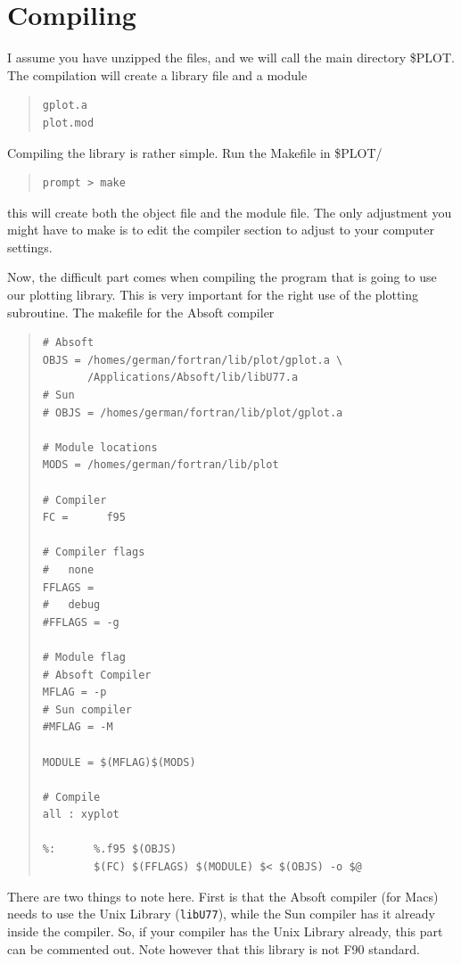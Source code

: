 \documentclass{article}
\begin{document}
\section{Compiling}
I assume you have unzipped the files, and we will call the main directory \$PLOT. The compilation will create a library file and a module
\begin{quote}
\begin{verbatim}
gplot.a
plot.mod
\end{verbatim}
\end{quote}

\noindent Compiling the library is rather simple. Run the Makefile in \$PLOT/
\begin{quote}
\begin{verbatim}
prompt > make
\end{verbatim}
\end{quote}
this will create both the object file and the module file. The only adjustment you might have to make is to edit the compiler section to adjust to your computer settings.

Now, the difficult part comes when compiling the program that is going to use our plotting library. This is very important for the right use of the plotting subroutine. The makefile for the Absoft compiler 
\begin{quote}
\begin{verbatim}
# Absoft
OBJS = /homes/german/fortran/lib/plot/gplot.a \
       /Applications/Absoft/lib/libU77.a 
# Sun 
# OBJS = /homes/german/fortran/lib/plot/gplot.a 

# Module locations
MODS = /homes/german/fortran/lib/plot

# Compiler
FC =      f95

# Compiler flags
#   none
FFLAGS = 
#   debug
#FFLAGS = -g 

# Module flag
# Absoft Compiler
MFLAG = -p
# Sun compiler
#MFLAG = -M

MODULE = $(MFLAG)$(MODS)

# Compile
all : xyplot 

%:      %.f95 $(OBJS)
        $(FC) $(FFLAGS) $(MODULE) $< $(OBJS) -o $@
\end{verbatim}
\end{quote}
There are two things to note here. First is that the Absoft compiler (for Macs) needs to use the Unix Library (\texttt{libU77}), while the Sun compiler has it already inside the compiler. So, if your compiler has the Unix Library already, this part can be commented out. Note however that this library is not F90 standard. 
\end{document}
